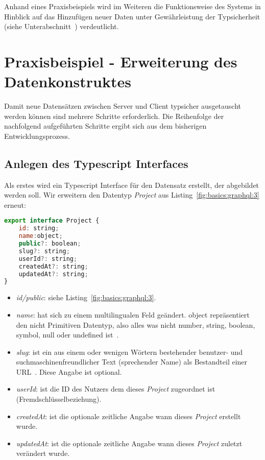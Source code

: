 Anhand eines Praxisbeispiels wird im Weiteren die Funktionsweise des Systems in Hinblick auf das Hinzufügen neuer Daten
unter Gewährleistung der Typsicherheit (siehe Unterabschnitt~) verdeutlicht.

\section{Praxisbeispiel - Erweiterung des Datenkonstruktes}
\label{sec:requirements:example}

Damit neue Datensätzen zwischen Server und Client typsicher ausgetauscht werden können sind mehrere Schritte erforderlich.
Die Reihenfolge der nachfolgend aufgeführten Schritte ergibt sich aus dem bisherigen Entwicklungsprozess.

\subsection{Anlegen des Typescript Interfaces}
\label{sec:requirements:example:interface}

Als erstes wird ein Typescript Interface für den Datensatz erstellt, der abgebildet werden soll.
Wir erweitern den Datentyp \emph{Project} aus Listing~\ref{fig:basics:graphql:3} erneut:

\begin{lstlisting}[language=JavaScript,float=h!,caption={Typescript Interface für die Darstellung eines Projektes}, label={lst:example:projectdesc}]
export interface Project {
    id: string;
    name:object;
    public?: boolean;
    slug?: string;
    userId?: string;
    createdAt?: string;
    updatedAt?: string;
}
\end{lstlisting}

\begin{itemize}
    \setlength\itemsep{-1em}
    \item \emph{id/public}: siehe Listing~\ref{fig:basics:graphql:3}.
    \item \emph{name}: hat sich zu einem multilingualen Feld geändert. object repräsentiert den nicht Primitiven Datentyp, also alles was nicht number, string, boolean, symbol, null oder undefined ist~\cite{typescript-object}.
    \item \emph{slug}: ist ein aus einem oder wenigen Wörtern bestehender benutzer- und suchmaschinenfreundlicher
    Text (sprechender Name) als Bestandteil einer URL~\cite{slug-wikipedia}. Diese Angabe ist optional.
    \item \emph{userId}: ist die ID des Nutzers dem dieses \emph{Project} zugeordnet ist (Fremdschlüsselbeziehung).
    \item \emph{createdAt}: ist die optionale zeitliche Angabe wann dieses \emph{Project} erstellt wurde.
    \item \emph{updatedAt}: ist die optionale zeitliche Angabe wann dieses \emph{Project} zuletzt verändert wurde.
\end{itemize}

